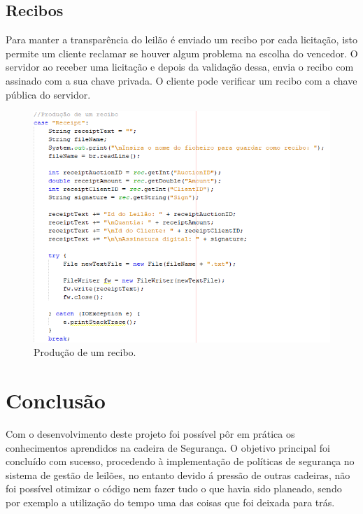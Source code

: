 \documentclass[pdftex,12pt,a4paper]{report}
\begin{document}
\newpage
\vskip 1.5cm
\subsection{Recibos}
Para manter a transparência do leilão é enviado um recibo por cada licitação, isto permite um cliente reclamar se houver algum problema na escolha do vencedor. O servidor ao receber uma licitação e depois da validação dessa, envia o recibo com assinado com a sua chave privada. O cliente pode verificar um recibo com a chave pública do servidor.
\begin{figure}[h]
    \centering
    \includegraphics[width=17.0cm]{receipt.png}
    \caption{Produção de um recibo.}
    \label{fig:mesh1}
\end{figure}


\newpage
\section{Conclusão}
Com o desenvolvimento deste projeto foi possível pôr em prática os conhecimentos aprendidos na cadeira de Segurança. O objetivo principal foi concluído com sucesso, procedendo à implementação de políticas de segurança no sistema de gestão de leilões, no entanto devido á pressão de outras cadeiras, não foi possível otimizar o código nem fazer tudo o que havia sido planeado, sendo por exemplo a utilização do tempo uma das coisas que foi deixada para trás.
\end{document}

